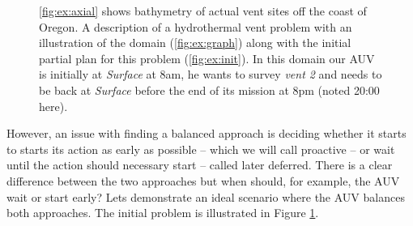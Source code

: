 \begin{figure}
  \hfill {}
  \caption{\small{\ref{fig:ex:axial} shows bathymetry of actual vent
      sites off the coast of Oregon. A description of a hydrothermal
      vent problem with an illustration of the domain
      (\ref{fig:ex:graph}) along with the initial partial plan for
      this problem (\ref{fig:ex:init}). In this domain our AUV is
      initially at {\em Surface} at 8am, he wants to survey {\em vent
        2} and needs to be back at {\em
        Surface} before the end of its mission at 8pm (noted 20:00
      here).}}
\label{fig:Example}
\end{figure}

However, an issue with finding a balanced approach is deciding whether
it starts to starts its action as early as possible -- which we will
call proactive 
-- or wait until the action should necessary start --
called later deferred. 
There is a clear difference between the two approaches
 but when should, for example, the AUV wait
or start early? Lets demonstrate an ideal scenario where the AUV
balances both approaches. The initial problem is illustrated in Figure \ref{fig:Example}. 

